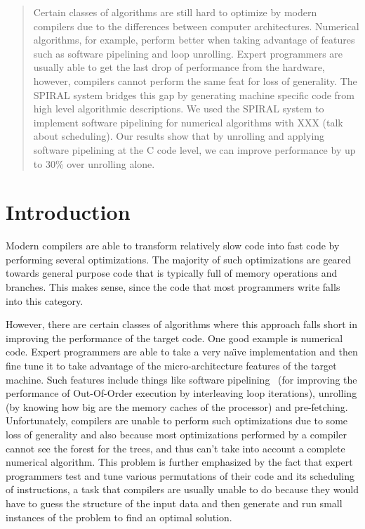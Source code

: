 \documentclass[10pt]{article}
\begin{document}
\maketitle

\begin{abstract}
   Certain classes of algorithms are still hard to optimize by modern compilers
   due to the differences between computer architectures.
   Numerical algorithms, for example, perform better when taking advantage of features
   such as software pipelining and loop unrolling. Expert programmers are usually able to
   get the last drop of performance from the hardware, however, compilers cannot perform the same
   feat for loss of generality. The SPIRAL system bridges this gap by generating machine specific code
   from high level algorithmic descriptions. We used the SPIRAL system to implement software
   pipelining for numerical algorithms with XXX (talk about scheduling). Our results show that
   by unrolling and applying software pipelining at the C code level, we can
   improve performance by up to 30\% over unrolling alone.
\end{abstract}

\section{Introduction}

Modern compilers are able to transform relatively slow code into fast code
by performing several optimizations. The majority of such optimizations
are geared towards general purpose code that is typically full of memory operations and
branches. This makes sense, since the code that most programmers write falls into this category.

However, there are certain classes of algorithms where this approach falls short in improving
the performance of the target code. One good example is numerical code. Expert programmers
are able to take a very na\"\i ve implementation and then fine tune it to take advantage of the
micro-architecture features of the target machine. Such features include things like software
pipelining~\cite{Rau:81} (for improving the performance of Out-Of-Order execution by interleaving loop iterations),
unrolling (by knowing how big are the memory caches of the processor) and pre-fetching.
Unfortunately, compilers are unable to perform such optimizations due
to some loss of generality and also because most optimizations performed by a compiler
cannot see the forest for the trees, and thus can't take into account a complete numerical algorithm.
This problem is further emphasized by the fact that expert programmers test and tune various permutations
of their code and its scheduling of instructions, a task that compilers are usually unable to do because
they would have to guess the structure of the input data and then generate and run small instances of the problem
to find an optimal solution.
\end{document}

